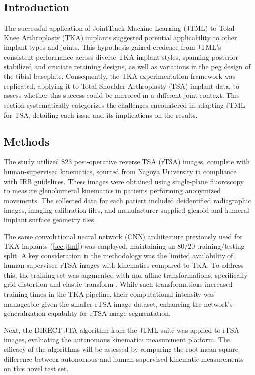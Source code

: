 \subsection{Introduction}
The successful application of JointTrack Machine Learning (JTML) to Total Knee Arthroplasty (TKA) implants suggested potential applicability to other implant types and joints.
This hypothesis gained credence from JTML's consistent performance across diverse TKA implant styles, spanning posterior stabilized and cruciate retaining designs, as well as variations in the peg design of the tibial baseplate.
Consequently, the TKA experimentation framework was replicated, applying it to Total Shoulder Arthroplasty (TSA) implant data, to assess whether this success could be mirrored in a different joint context.
This section systematically categorizes the challenges encountered in adapting JTML for TSA, detailing each issue and its implications on the results.

\subsection{Methods}
The study utilized 823 post-operative reverse TSA (rTSA) images, complete with human-supervised kinematics, sourced from Nagoya University in compliance with IRB guidelines.
These images were obtained using single-plane fluoroscopy to measure glenohumeral kinematics in patients performing anonymized movements.
The collected data for each patient included deidentified radiographic images, imaging calibration files, and manufacturer-supplied glenoid and humeral implant surface geometry files.


The same convolutional neural network (CNN) architecture previously used for TKA implants \cite{wangDeepHighResolutionRepresentation2020} (\cref{sec:jtml}) was employed, maintaining an 80/20 training/testing split.
A key consideration in the methodology was the limited availability of human-supervised rTSA images with kinematics compared to TKA.
To address this, the training set was augmented with non-affine transformations, specifically grid distortion and elastic transform \cite{buslaevAlbumentationsFastFlexible2020}.
While such transformations increased training times in the TKA pipeline, their computational intensity was manageable given the smaller rTSA image dataset, enhancing the network's generalization capability for rTSA image segmentation.

Next, the DIRECT-JTA algorithm from the JTML suite was applied to rTSA images, evaluating the autonomous kinematics measurement platform.
The efficacy of the algorithms will be assessed by comparing the root-mean-square difference between autonomous and human-supervised kinematic measurements on this novel test set.

